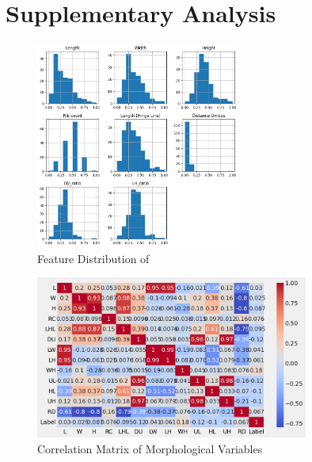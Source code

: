 %
%
%                 

\chapter{Supplementary Analysis}
\label{sec:appendixb}

%
%
%
%

\begin{figure}[!htbp]
	\centering
	\includegraphics[width=0.6\textwidth]{figures/sample_distribution.png}
	\caption{Feature Distribution of \Tegillarcagranosa}
\end{figure}

\begin{figure}[!htbp]
	\centering
	\includegraphics[width=0.8\textwidth]{figures/corr_matrix.png}
	\caption{Correlation Matrix of Morphological Variables \Tegillarcagranosa}
\end{figure}


